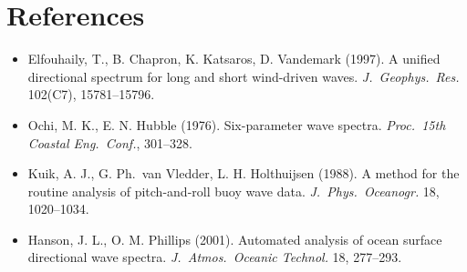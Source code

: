 \documentclass[11pt,a4paper]{article}
\begin{document}
\section*{References}
\begin{itemize}\itemsep1pt
\item Elfouhaily, T., B. Chapron, K. Katsaros, D. Vandemark (1997). A unified directional spectrum for long and short wind-driven waves. \emph{J.\ Geophys.\ Res.} 102(C7), 15781--15796.
\item Ochi, M. K., E. N. Hubble (1976). Six-parameter wave spectra. \emph{Proc.\ 15th Coastal Eng.\ Conf.}, 301--328.
\item Kuik, A. J., G. Ph.\ van Vledder, L. H. Holthuijsen (1988). A method for the routine analysis of pitch-and-roll buoy wave data. \emph{J.\ Phys.\ Oceanogr.} 18, 1020--1034.
\item Hanson, J. L., O. M. Phillips (2001). Automated analysis of ocean surface directional wave spectra. \emph{J.\ Atmos.\ Oceanic Technol.} 18, 277--293.
\end{itemize}
\end{document}
